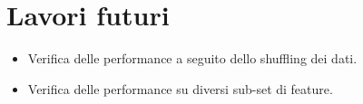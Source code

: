 \documentclass[fleqn,10pt]{SelfArx} %
\begin{document}
\section{Lavori futuri}
\begin{itemize}
\item Verifica delle performance a seguito dello shuffling dei dati.
\item Verifica delle performance su diversi sub-set di feature.

\end{itemize}







\end{document}
